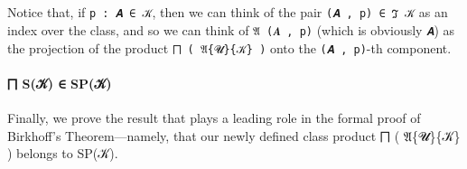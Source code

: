 \begin{code}
\AgdaSpace{}%
\AgdaSpace{}%
\AgdaSymbol{(}\AgdaSpace{}%
\AgdaSymbol{)}\AgdaSpace{}%
\<%
\\
%
\>[1]\AgdaSymbol{\{}\AgdaSymbol{\}}\AgdaSpace{}%
\AgdaSpace{}%
\AgdaSymbol{=}\AgdaSpace{}%
\AgdaSpace{}%
\AgdaSpace{}%
\AgdaSymbol{(}\AgdaSpace{}%
\AgdaSymbol{:}\AgdaSpace{}%
\AgdaSymbol{(}\AgdaSpace{}%
\AgdaSpace{}%
\AgdaSpace{}%
\AgdaSymbol{(}\AgdaSpace{}%
\AgdaSpace{}%
\AgdaSymbol{)}\AgdaSpace{}%
\AgdaFunction{,}\AgdaSpace{}%
\AgdaSpace{}%
\AgdaSpace{}%
\AgdaSymbol{))}\AgdaSpace{}%
\AgdaSpace{}%
\AgdaSpace{}%
\AgdaSpace{}%
\<%
\\
\>[0]\<%
\end{code}

Notice that, if \texttt{p\ :\ 𝑨\ ∈\ 𝒦}, then we can think of the pair
\texttt{(𝑨\ ,\ p)\ ∈\ ℑ\ 𝒦} as an index over the class, and so we can
think of \texttt{𝔄\ (𝑨\ ,\ p)} (which is obviously \texttt{𝑨}) as the
projection of the product \texttt{⨅\ (\ 𝔄\{𝓤\}\{𝒦\}\ )} onto the
\texttt{(𝑨\ ,\ p)}-th component.

\paragraph{⨅ S(𝒦) ∈ SP(𝒦)}\label{sux1d4a6-spux1d4a6}

Finally, we prove the result that plays a leading role in the formal
proof of Birkhoff's Theorem---namely, that our newly defined class
product ⨅ ( 𝔄\{𝓤\}\{𝒦\} ) belongs to SP(𝒦).

